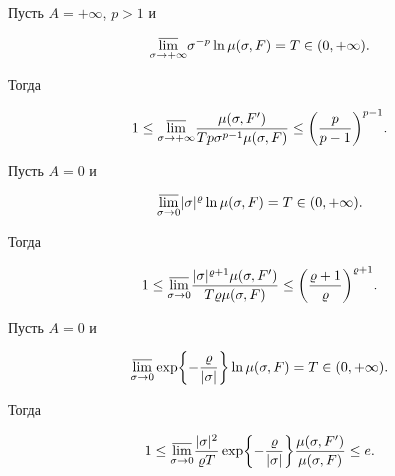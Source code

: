 \begin{cor} Пусть $A=+\infty$, $p>1$ и


$$


\underset{\s\to +\infty}{\varlimsup}{}\s^{-p}\ln\mu(\s,F)=T\in(0,+\infty).


$$


Тогда


\begin{equation}


1\le\underset{\s\to +\infty}{\varlimsup}{}


\frac{\mu(\s,F')}{T p \s^{p-1}\mu(\s,F)}\le 


\biggl(\frac{p}{p-1}\biggr)^{p-1}.


\end{equation}


\end{cor}





\begin{cor} Пусть $A=0$ и


$$


\underset{\s\to 0}{\varlimsup}{}|\s|^{\r}\ln\mu(\s,F)=T\in(0,+\infty).


$$


Тогда


\begin{equation}


1\le\underset{\s\to 0}{\varlimsup}{}


\frac{|\s|^{\r+1}\mu(\s,F')}{T \r\mu(\s,F)}\le 


\biggl(\frac{\r+1}{\r}\biggr)^{\r+1}.


\end{equation}


\end{cor}





\begin{cor} Пусть $A=0$ и


$$


\underset{\s\to 0}{\varlimsup}\exp\biggl\{-\frac{\r}{|\s|}\biggr\}


\ln\mu(\s,F)=T\in(0,+\infty).


$$


Тогда


\begin{equation}


1\le\underset{\s\to 0}{\varlimsup}{}\frac{|\s|^2}{\r T}


\exp\biggl\{-\frac{\r}{|\s|}\biggr\}


\frac{\mu(\s,F')}{\mu(\s,F)}\le e.


\end{equation}


\end{cor}





